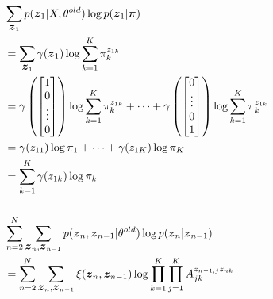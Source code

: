 \begin{align}
  &\sum_{\bvec{z}_1}p(\bvec{z}_1|X,\theta^{old})\log p(\bvec{z}_1|\bvec{\pi}) \\
  &= \sum_{\bvec{z}_1}\gamma(\bvec{z}_1)\log \sum_{k=1}^K\pi_k^{z_{1k}} \\
  &= \gamma\left(\begin{bmatrix} 1 \\ 0 \\ \vdots \\ 0 \\ \end{bmatrix}\right) \log \sum_{k=1}^K\pi_k^{z_{1k}} + \dots + \gamma\left(\begin{bmatrix} 0 \\ \vdots \\ 0 \\ 1 \\ \end{bmatrix}\right) \log \sum_{k=1}^K\pi_k^{z_{1k}} \\
  &= \gamma(z_{11})\log \pi_1 + \dots + \gamma(z_{1K})\log \pi_K \\
  &= \sum_{k=1}^K\gamma(z_{1k})\log \pi_k \label{eq:initial-expect} \\\\
  & \sum_{n=2}^N\sum_{\bvec{z}_n,\bvec{z}_{n-1}}p(\bvec{z}_n,\bvec{z}_{n-1}|\theta^{old})\log p(\bvec{z}_n|\bvec{z}_{n-1}) \\
  &= \sum_{n=2}^N\sum_{\bvec{z}_n,\bvec{z}_{n-1}}\xi(\bvec{z}_n,\bvec{z}_{n-1})\log \prod_{k=1}^K\prod_{j=1}^KA_{jk}^{z_{n-1,j}z_{nk}} \\

\end{align}
